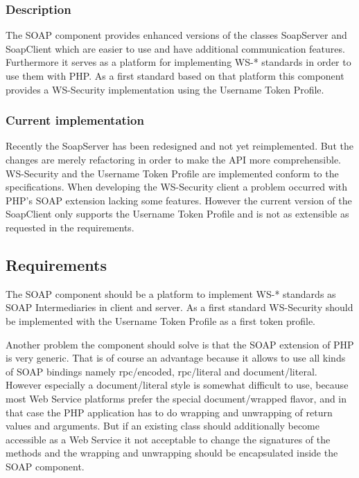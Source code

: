 \documentclass[10pt,final,a4paper,oneside]{article}
\begin{document}
\subsubsection{Description}
The SOAP component provides enhanced versions of
the classes SoapServer and SoapClient
which are easier to use and have additional
communication features.
Furthermore it serves as a platform for implementing
WS-* standards in order to use them with PHP.
As a first standard based on that platform
this component provides a WS-Security implementation
using the Username Token Profile.


\subsubsection{Current implementation}
Recently the SoapServer has been redesigned
and not yet reimplemented.
But the changes are merely refactoring
in order to make the API more comprehensible.
WS-Security and the Username Token Profile
are implemented conform to the specifications.
When developing the WS-Security client a
problem occurred with PHP's SOAP extension
lacking some features.
However the current version of the SoapClient only supports the
Username Token Profile and is not as extensible
as requested in the requirements. 


\subsection{Requirements}\label{subsec:SOAPRequirements}
The SOAP component should be
a platform to implement WS-* standards
as SOAP Intermediaries in client and server.
As a first standard WS-Security should be implemented
with the Username Token Profile as a first token profile.

Another problem the component should solve
is that the SOAP extension of PHP is very generic.
That is of course an advantage because it allows
to use all kinds of SOAP bindings namely
rpc/encoded, rpc/literal and document/literal.
However especially a document/literal style
is somewhat difficult to use, because most
Web Service platforms prefer the special
document/wrapped flavor, and in that case
the PHP application has to do wrapping and
unwrapping of return values and arguments.
But if an existing class should additionally
become accessible as a Web Service
it not acceptable to change the signatures
of the methods and the wrapping and unwrapping
should be encapsulated inside the SOAP component.
\end{document}

